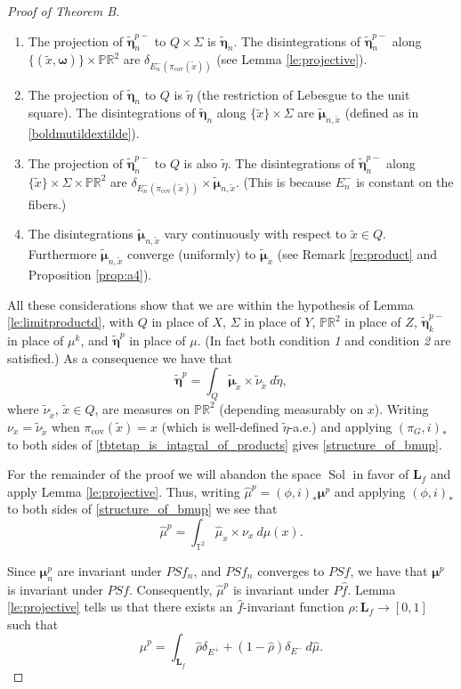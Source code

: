 \documentclass[10pt,a4paper]{amsart}
\newcommand{\Pp}{\mathbb P}
\newcommand{\RR}{\mathbb{R}^2}
\newcommand{\Sol}{\operatorname{Sol}}
\newcommand{\TT}{\mathbb{T}^2}
\newcommand{\bmu}{\boldsymbol{\mu}}
\newcommand{\bomega}{\boldsymbol{\omega}}
\newcommand{\hTTf}[1][f]{\mathbf{L}_{#1}}
\newcommand{\hf}{\hat{f}}
\newcommand{\hmu}{\hat{\mu}}
\newcommand{\pcov}{\pi_{\mathrm{cov}}}
\newcommand{\tbeta}{\tilde{\boldsymbol{\eta}}}
\newcommand{\tbmu}{\tilde{\bmu}}
\newcommand{\teta}{\tilde{\eta}}
\newcommand{\tx}{\tilde{x}}
\begin{document}
\begin{proof}[Proof of Theorem B]
\begin{enumerate}
\item
The projection of $\tbeta_n^{p-}$ to $Q \times \Sigma$ is $\tbeta_n $. The disintegrations of $\tbeta_n^{p-}$ along $ \{(\tx, \bomega) \} \times \Pp \RR$ are $\delta_{E^-_n(\pcov(\tx))}$ (see Lemma \ref{le:projective}). 
\item
The projection of $\tbeta_n$ to $Q$ is $\teta$ (the restriction of Lebesgue to the unit square). The disintegrations of $\tbeta_n$ along $\{\tx\}\times \Sigma$ are $\tbmu_{n,\tx}$ (defined as in \eqref{boldmutildextilde}).
\item
The projection of $\tbeta_n^{p-}$ to $Q$ is also $\teta$. The disintegrations of $\tbeta_n^{p-}$ along $\{\tx\} \times \Sigma \times \Pp \RR$ are $\delta_{E^-_n(\pcov(\tx))}\times\tbmu_{n,\tx}$. (This is because $E^-_n$ is constant on the fibers.)
\item
The disintegrations $\tbmu_{n,\tx}$ vary continuously with respect to  $\tx\in Q$. Furthermore  $\tbmu_{n,\tx}$ converge (uniformly) to $\tbmu_x$ (see Remark \ref{re:product} and Proposition \ref{prop:a4}).
\end{enumerate}

All these considerations show that we are within the hypothesis of Lemma \ref{le:limitproductd}, with $Q$ in place of $X$, $\Sigma$ in place of $Y$, $\Pp \RR$ in place of $Z$, $\tbeta_k^{p-}$ in place of $\mu^k$, and $\tbeta^{p}$ in place of $\mu$. (In fact both condition \emph{1} and condition \emph{2} are satisfied.) As a consequence we have that
\begin{equation} \label{tbtetap_is_intagral_of_products}
\tbeta^p=\int_{ Q}  \tbmu_{\tx}  \times \tilde{\nu}_{\tx} \ d\teta,
\end{equation}
where $\tilde{\nu}_{\tx}$, $\tx \in Q$,  are measures on $\Pp \RR$ (depending measurably on $x$). Writing $\nu_x = \tilde{\nu}_{\tx}$ when $\pcov(\tx) = x$ (which is well-defined $\teta$-a.e.) and applying $(\pi_G,i)_*$ to both sides of \eqref{tbtetap_is_intagral_of_products} gives \eqref{structure_of_bmup}. 

For the remainder of the proof we will abandon the space $\Sol$ in favor of $\hTTf$ and apply Lemma \ref{le:projective}. Thus, writing $\hmu^p = (\phi,i)_* \bmu^p$ and applying $(\phi,i)_*$ to both sides of \eqref{structure_of_bmup} we see that
\[ \hmu^p = \int_{\TT} \hat\mu_x \times \nu_x \ d\mu(x). \]

Since $\bmu_n^p$ are invariant under $PS f_n$, and $PS f_n$ converges to $PS f$, we have that $\bmu^p$ is invariant under $PS f$. Consequently, $\hmu^p$ is invariant under $P \hf$. Lemma \ref{le:projective} tells us that there exists an $\hat f$-invariant function $\hat\rho:\hTTf\rightarrow[0,1]$ such that
$$
\hat\mu^p=\int_{\hTTf}\hat\rho\delta_{E^+}+(1-\hat\rho)\delta_{E^-}\ d\hat\mu.
$$


\end{proof}
\end{document}
